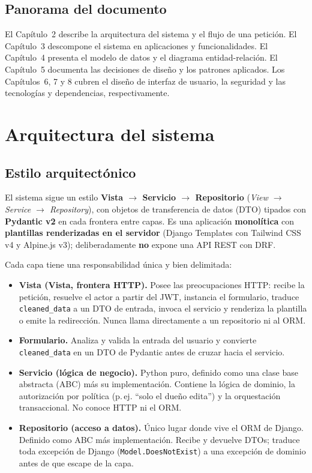 \documentclass[12pt,letterpaper]{report}
\begin{document}
\section{Panorama del documento}

El Capítulo~2 describe la arquitectura del sistema y el flujo de una petición.
El Capítulo~3 descompone el sistema en aplicaciones y funcionalidades. El
Capítulo~4 presenta el modelo de datos y el diagrama entidad-relación. El
Capítulo~5 documenta las decisiones de diseño y los patrones aplicados. Los
Capítulos~6, 7 y 8 cubren el diseño de interfaz de usuario, la seguridad y las
tecnologías y dependencias, respectivamente.

\chapter{Arquitectura del sistema}

\section{Estilo arquitectónico}

El sistema sigue un estilo \textbf{Vista $\rightarrow$ Servicio $\rightarrow$
Repositorio} (\textit{View $\rightarrow$ Service $\rightarrow$ Repository}),
con objetos de transferencia de datos (DTO) tipados con \textbf{Pydantic v2} en
cada frontera entre capas. Es una aplicación \textbf{monolítica} con
\textbf{plantillas renderizadas en el servidor} (Django Templates con Tailwind
CSS v4 y Alpine.js v3); deliberadamente \textbf{no} expone una API REST con
DRF.

Cada capa tiene una responsabilidad única y bien delimitada:

\begin{itemize}[leftmargin=1.4em]
  \item \textbf{Vista (Vista, frontera HTTP).} Posee las preocupaciones HTTP:
  recibe la petición, resuelve el actor a partir del JWT, instancia el formulario,
  traduce \texttt{cleaned\_data} a un DTO de entrada, invoca el servicio y
  renderiza la plantilla o emite la redirección. Nunca llama directamente a un
  repositorio ni al ORM.
  \item \textbf{Formulario.} Analiza y valida la entrada del usuario y convierte
  \texttt{cleaned\_data} en un DTO de Pydantic antes de cruzar hacia el servicio.
  \item \textbf{Servicio (lógica de negocio).} Python puro, definido como una
  clase base abstracta (ABC) más su implementación. Contiene la lógica de
  dominio, la autorización por política (p.\,ej. ``solo el dueño edita'') y la
  orquestación transaccional. No conoce HTTP ni el ORM.
  \item \textbf{Repositorio (acceso a datos).} Único lugar donde vive el ORM de
  Django. Definido como ABC más implementación. Recibe y devuelve DTOs; traduce
  toda excepción de Django (\texttt{Model.DoesNotExist}) a una excepción de
  dominio antes de que escape de la capa.
\end{itemize}
\end{document}
